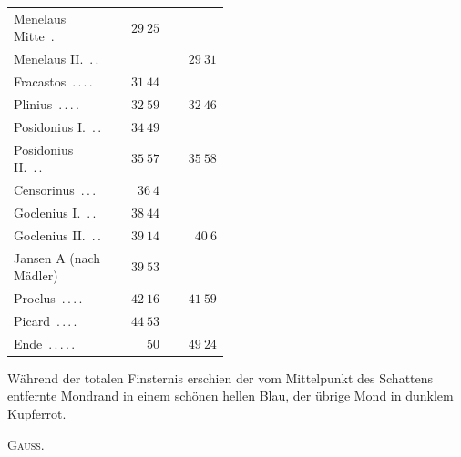 \begin{center}
\begin{tabular}{@{}p{0.47\linewidth}|r|r@{}}
Menelaus Mitte\ \mbox{.} & $29\ 25$ & \\
Menelaus II.\ \mbox{.\,.} &  & $29\ 31$\\
Fracastos\ \mbox{.\,.\,.\,.} & $31\ 44$ & \\
Plinius\ \mbox{.\,.\,.\,.} & $32\ 59$ & $32\ 46$\\
Posidonius I.\ \mbox{.\,.} & $34\ 49$ & \\
Posidonius II.\ \mbox{.\,.} & $35\ 57$ & $35\ 58$\\
Censorinus\ \mbox{.\,.\,.} & $36\ 4$ & \\
Goclenius I.\ \mbox{.\,.} & $38\ 44$ & \\
Goclenius II.\ \mbox{.\,.} & $39\ 14$ & $40\ 6$\\
Jansen A (nach Mädler) & $39\ 53$ & \\
Proclus\ \mbox{.\,.\,.\,.} & $42\ 16$ & $41\ 59$\\
Picard\ \mbox{.\,.\,.\,.} & $44\ 53$ & \\
Ende\ \mbox{.\,.\,.\,.\,.} & $50$ & $49\ 24$\\
\end{tabular}\endgroup\end{center}

Während der totalen Finsternis erschien der vom Mittelpunkt des Schattens entfernte Mondrand in einem schönen hellen Blau, der übrige Mond in dunklem Kupferrot.
\begin{flushright}\textsc{Gauss.}\end{flushright}
